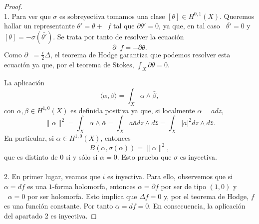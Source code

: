 \documentclass[autocontact]{gaceta}
\theoremstyle{definition} \newtheorem{defn}[thm]{Definición}
\theoremstyle{definition} \newtheorem{ejemplo}[thm]{Ejemplo}
\theoremstyle{definition} \newtheorem{ejercicio}[thm]{Ejercicio}
\DeclareMathOperator{\delbar}{\bar{\partial}}
\begin{document}
      \begin{proof} \ \\
1.	Para ver que $\sigma$ es sobreyectiva tomamos una clase $[\theta] \in H^{0,1}(X)$. Queremos hallar un representante $\theta'=\theta + \delbar f$ tal que $\partial \theta'=0$, ya que, en tal caso $\delbar \bar{\theta'}=0$ y $[\theta]=-\sigma( \bar{\theta'})$. Se trata por tanto de resolver la ecuación
	\begin{equation*}
	  \partial \delbar f = -\partial \theta.
	\end{equation*}
	Como $\partial \delbar = \tfrac{i}{2} \Delta$, el teorema de Hodge garantiza que podemos resolver esta ecuación ya que, por el teorema de Stokes, $\int_X \partial \theta = 0$. 

	La aplicación
	\begin{equation*}
	 \langle \alpha,\beta \rangle=  \int_X \alpha \wedge \bar{\beta},
	\end{equation*}
	con $\alpha, \beta \in H^{1,0}(X)$ es definida positiva ya que, si localmente $\alpha=adz$,
	\begin{equation*}
	  \lVert \alpha \rVert^2 = \int_X \alpha \wedge \bar{\alpha} = \int_X a \bar{a} dz \wedge d\bar{z} = \int_X  |a|^2 dz \wedge d\bar{z}.
	\end{equation*}
	En particular, si $\alpha \in H^{1,0}(X)$, entonces
	\begin{equation*}
	  B(\alpha,\sigma(\alpha)) = \lVert \alpha \rVert ^2,
	\end{equation*}
	que es distinto de $0$ si y sólo si $\alpha=0$. Esto prueba que $\sigma$ es inyectiva. \ \\
	\ \\
	2. En primer lugar, veamos que $i$ es inyectiva. Para ello, observemos que si $\alpha=df$ es una $1$-forma holomorfa, entonces $\alpha=\partial f$ por ser de tipo $(1,0)$ y $\delbar \alpha = 0$ por ser holomorfa. Esto implica que $\Delta f =0$ y, por el teorema de Hodge, $f$ es una función constante. Por tanto $\alpha = df =0$. En consecuencia, la aplicación del apartado 2 es inyectiva.


\end{proof}
\end{document}
